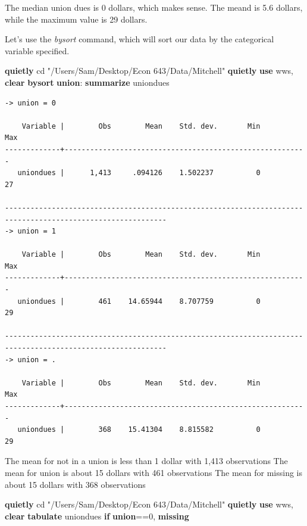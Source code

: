 \documentclass[
]{book}
\newenvironment{Shaded}{\begin{snugshade}}{\end{snugshade}}
\newcommand{\FunctionTok}[1]{\textcolor[rgb]{0.13,0.29,0.53}{\textbf{#1}}}
\newcommand{\KeywordTok}[1]{\textcolor[rgb]{0.13,0.29,0.53}{\textbf{#1}}}
\newcommand{\NormalTok}[1]{#1}
\newcommand{\StringTok}[1]{\textcolor[rgb]{0.31,0.60,0.02}{#1}}
\begin{document}
The median union dues is 0 dollars, which makes sense. The meand is 5.6 dollars, while the maximum value is 29 dollars.

Let's use the \emph{bysort} command, which will sort our data by the categorical variable specified.

\begin{Shaded}
\begin{Highlighting}[]
\KeywordTok{quietly}\NormalTok{ cd }\StringTok{"/Users/Sam/Desktop/Econ 643/Data/Mitchell"}
\KeywordTok{quietly} \KeywordTok{use}\NormalTok{ wws, }\KeywordTok{clear}
\KeywordTok{bysort} \KeywordTok{union}\NormalTok{: }\KeywordTok{summarize}\NormalTok{ uniondues}
\end{Highlighting}
\end{Shaded}

\begin{verbatim}
-> union = 0

    Variable |        Obs        Mean    Std. dev.       Min        Max
-------------+---------------------------------------------------------
   uniondues |      1,413     .094126    1.502237          0         27

------------------------------------------------------------------------------------------------------------
-> union = 1

    Variable |        Obs        Mean    Std. dev.       Min        Max
-------------+---------------------------------------------------------
   uniondues |        461    14.65944    8.707759          0         29

------------------------------------------------------------------------------------------------------------
-> union = .

    Variable |        Obs        Mean    Std. dev.       Min        Max
-------------+---------------------------------------------------------
   uniondues |        368    15.41304    8.815582          0         29
\end{verbatim}

The mean for not in a union is less than 1 dollar with 1,413 observations
The mean for union is about 15 dollars with 461 observations
The mean for missing is about 15 dollars with 368 observations

\begin{Shaded}
\begin{Highlighting}[]
\KeywordTok{quietly}\NormalTok{ cd }\StringTok{"/Users/Sam/Desktop/Econ 643/Data/Mitchell"}
\KeywordTok{quietly} \KeywordTok{use}\NormalTok{ wws, }\KeywordTok{clear}
\KeywordTok{tabulate}\NormalTok{ uniondues }\KeywordTok{if} \KeywordTok{union}\NormalTok{==0, }\FunctionTok{missing}
\end{Highlighting}
\end{Shaded}
\end{document}
